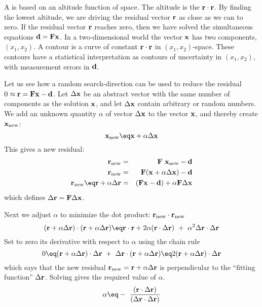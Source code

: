 \par
A  is based on an altitude function of space.
The altitude is the   $\bold r \cdot \bold r$.
By finding the lowest altitude,
we are driving the residual vector  $\bold r$  as close as we can to zero.
If the residual vector  $\bold r$  reaches zero, then we have solved
the simultaneous equations  $\bold d= \bold F \bold x$.
In a two-dimensional world the vector  $\bold x$  has two components,
$(x_1 , x_2 )$.
A contour is a curve of constant
$\bold r \cdot \bold r$  in $(x_1 , x_2 )$-space.
These contours have a statistical interpretation as contours
of uncertainty in $(x_1 , x_2 )$, with measurement errors in $\bold d$.
\par
Let us see how a random search-direction
can be used to reduce the residual
$0\approx \bold r= \bold F \bold x - \bold d$.
Let $\Delta \bold x$ be an abstract vector
with the same number of components as the solution $\bold x$,
and let $\Delta \bold x$ contain arbitrary or random numbers.
We add an unknown quantity $\alpha$
of vector $\Delta \bold x$ to the vector $\bold x$,
and thereby create $\bold x_{\rm new}$:
\begin{equation}
\bold x_{\rm new} \eq \bold x+\alpha \Delta \bold x
\label{eqn:oldx}
\end{equation}
This gives a new residual:
\begin{eqnarray}
\bold r_{\rm new} &=& \bold F\ \bold x_{\rm new}           -\bold d \\
\bold r_{\rm new} &=& \bold F( \bold x+\alpha\Delta\bold x)-\bold d\\
\bold r_{\rm new} \eq
\bold r+\alpha \Delta\bold r
                  &=& (\bold F \bold x-\bold d)
                                                +\alpha\bold F\Delta\bold x 
\label{eqn:resupdatelin}
\end{eqnarray}
which defines $\Delta \bold r = \bold F \Delta \bold x$.

\par
Next we adjust $\alpha$ to minimize the dot product:
$ \bold r_{\rm new} \cdot \bold r_{\rm new} $
\begin{equation}
(\bold r+\alpha\Delta \bold r)\cdot (\bold r+\alpha\Delta \bold r) \eq
\bold r\cdot \bold r + 2\alpha (\bold r \cdot \Delta \bold r) \ +\ 
\alpha^2 \Delta \bold r \cdot \Delta \bold r
\label{eqn:mindot}
\end{equation}
Set to zero its derivative with respect to  $\alpha$ using the chain rule
\begin{equation}
0\eq 
(\bold r+\alpha\Delta \bold r)
\cdot
\Delta \bold r
\ +\ 
\Delta \bold r
\cdot
(\bold r+\alpha\Delta \bold r)
\eq
2
(\bold r+\alpha\Delta \bold r)
\cdot
\Delta \bold r
\label{eqn:newresperp}
\end{equation}
which says that
the new residual $\bold r_{\rm new} = \bold r + \alpha \Delta \bold r$ is
perpendicular to the ``fitting function'' $\Delta \bold r$.
Solving gives the required value of $\alpha$.
\begin{equation}
\alpha \eq - \ { (\bold r \cdot \Delta \bold r ) \over
( \Delta \bold r \cdot \Delta \bold r ) }
\label{eqn:alfa}
\end{equation}

